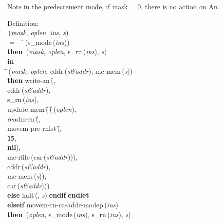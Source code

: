  Note in the predecrement mode, if mask = 0, there is no action on An.
\begin{tabbing}{\sc Definition}: \\  
\=\,({\it{mask\/}}, {\it{oplen\/}}, {\it{ins\/}}, {\it{s\/}}) \\ 
$=$$\;\;\;\;$\=\,({\rm{s\_mode}}\,({\it{ins\/}})) \\ 
{\bf then }\=\=\,({\it{mask\/}}, {\it{oplen\/}}, {\rm{s\_rn}}\,({\it{ins\/}}), {\it{s\/}})\- \\ 
{\bf in} \\ 
\=\,({\it{mask\/}}, {\it{oplen\/}}, {\rm{cddr}}\,({\it{s\&addr\/}}), {\rm{mc-mem}}\,({\it{s\/}})) \\ 
{\bf then }{\rm{write-an}}\,(\=, \\ 
{\rm{cddr}}\,({\it{s\&addr\/}}), \\ 
{\rm{s\_rn}}\,({\it{ins\/}}), \\ 
{\rm{update-mem}}\,(\=\,(\=\,({\it{oplen\/}}), \\ 
{\rm{readm-rn}}\,(\=, \\ 
{\rm{movem-pre-rnlst}}\,(\=, \\ 
{\tt{15}}, \\ 
{\bf{nil}})\-, \\ 
{\rm{mc-rfile}}\,({\rm{car}}\,({\it{s\&addr\/}})))\-, \\ 
{\rm{cddr}}\,({\it{s\&addr\/}}), \\ 
{\rm{mc-mem}}\,({\it{s\/}}))\-, \\ 
{\rm{car}}\,({\it{s\&addr\/}}))\-)\- \\ 
{\bf else }{\rm{halt}}\,({}, {\it{s\/}})$\;${\bf  endif}\-$\;${\bf  endlet}\- \\ 
{\bf elseif }{\rm{movem-rn-ea-addr-modep}}\,({\it{ins\/}}) \\ 
{\bf then }\=\=\,({\it{oplen\/}}, {\rm{s\_mode}}\,({\it{ins\/}}), {\rm{s\_rn}}\,({\it{ins\/}}), {\it{s\/}})\- \\ 
$$
\end{tabbing}
